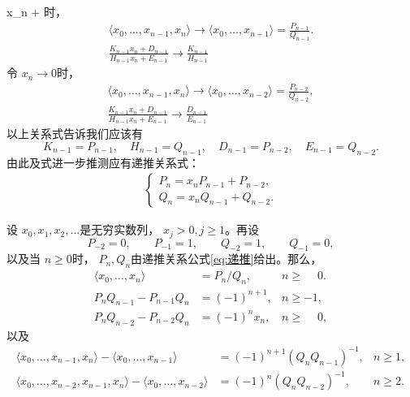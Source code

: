 x_n \to + \infty \)时，
\begin{gather*}
	\langle x_0, \dots, x_{n-1}, x_n \rangle \to \langle x_0, \dots, x_{n-1} \rangle = \frac{P_{n-1}}{Q_{n-1}}. \\
	\frac{K_{n-1}x_n + D_{n-1}}{H_{n-1}x_n + E_{n-1}} \to \frac{K_{n-1}}{H_{n-1}}
\end{gather*}
令 \( x_n \to 0 \)时，
\begin{gather*}
	\langle x_0, \dots, x_{n-1}, x_n \rangle \to \langle x_0, \dots, x_{n-2} \rangle = \frac{P_{n-2}} {Q_{n-2}}, \\
	\frac{K_{n-1}x_n + D_{n-1}}{H_{n-1}x_n + E_{n-1}} \to \frac{D_{n-1}}{E_{n-1}}
\end{gather*}
以上关系式告诉我们应该有
\begin{equation}
	K_{n-1} = P_{n-1}, \quad H_{n-1} = Q_{n-1}, \quad D_{n-1} = P_{n-2}, \quad E_{n-1} = Q_{n-2}.
\end{equation}
由此及式进一步推测应有递推关系式：
\begin{align}\label{eq:递推}
	\begin{cases}
		P_n  = x_nP_{n-1} + P_{n-2}, \\
		Q_n  = x_nQ_{n-1} + Q_{n-2}.
	\end{cases}
\end{align}

\begin{theorem} \label{thrm:PQ}
	设 \( x_0, x_1, x_2, \dots \)是无穷实数列， \( x_j > 0, j \ge 1 \)。再设
	\begin{equation}\label{thrm02eq:00}
		P_{-2} = 0,\qquad P_{-1} = 1,\qquad Q_{-2} = 1,\qquad Q_{-1} = 0,
	\end{equation}
	以及当 \( n \ge 0 \)时， \( P_n, Q_n \)由递推关系公式\eqref{eq:递推}给出。那么，
	\begin{align}
		\langle x_0, \dots, x_n \rangle & = P_n / Q_n,  & n \ge \phantom{-}0. \label{thrm02eq:01} \\
		P_nQ_{n-1} - P_{n-1}Q_n         & = (-1)^{n+1}, & n \ge -1,           \label{thrm02eq:02} \\
		P_nQ_{n-2} - P_{n-2}Q_n         & = (-1)^nx_n,  & n \ge \phantom{-}0,\label{thrm02eq:03}
	\end{align}
	以及
	\begin{align}
		\langle x_0, \dots, x_{n-1}, x_n \rangle - \langle x_0, \dots, x_{n-1} \rangle
		 & = (-1)^{n+1}(Q_nQ_{n-1})^{-1}, & n \ge 1, \label{thrm02eq:04} \\
		\langle x_0, \dots,x_{n-2},  x_{n-1}, x_n \rangle - \langle x_0, \dots, x_{n-2} \rangle
		 & = (-1)^{n}(Q_nQ_{n-2})^{-1},   & n \ge 2.\label{thrm02eq:05}
	\end{align}
\end{theorem}

